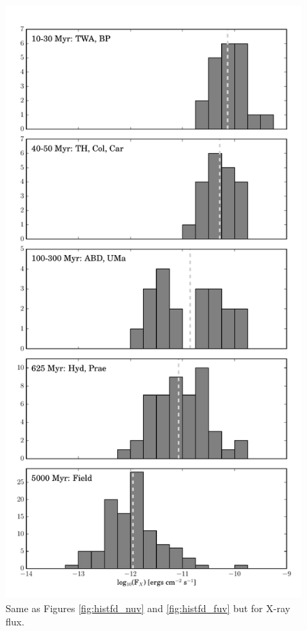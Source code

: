 \documentclass[twocolumn]{aastex62}
\begin{document}
\begin{figure}[t]
\centering
\includegraphics[height=0.6\textheight]{histfd_xray.pdf}
\caption{Same as Figures \ref{fig:histfd_nuv} and \ref{fig:histfd_fuv} but for X-ray flux. \label{fig:histfd_xray}}
\end{figure}
\end{document}
